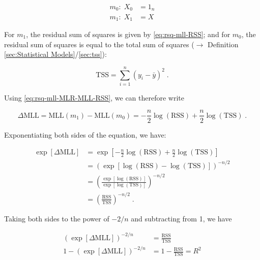 \documentclass[a4paper,12pt,twoside]{book}
\begin{document}
\begin{equation} \label{eq:rsq-mll-m0-m1}
\begin{split}
m_0: \; X_0 &= 1_n \\
m_1: \; X_1 &= X
\end{split}
\end{equation}

For $m_1$, the residual sum of squares is given by \eqref{eq:rsq-mll-RSS}; and for $m_0$, the residual sum of squares is equal to the total sum of squares ($\rightarrow$ Definition \ref{sec:Statistical Models}/\ref{sec:tss}):

\begin{equation} \label{eq:rsq-mll-TSS}
\mathrm{TSS} = \sum_{i=1}^n (y_i - \bar{y})^2 \; .
\end{equation}

Using \eqref{eq:rsq-mll-MLR-MLL-RSS}, we can therefore write

\begin{equation} \label{eq:rsq-mll-MLR-DMLL}
\Delta\mathrm{MLL} = \mathrm{MLL}(m_1) - \mathrm{MLL}(m_0) = - \frac{n}{2} \log(\mathrm{RSS}) + \frac{n}{2} \log(\mathrm{TSS}) \; .
\end{equation}

Exponentiating both sides of the equation, we have:

\begin{equation} \label{eq:rsq-mll-MLR-DMLL-RTSS}
\begin{split}
\exp[\Delta\mathrm{MLL}] &= \exp\left[ - \frac{n}{2} \log(\mathrm{RSS}) + \frac{n}{2} \log(\mathrm{TSS}) \right] \\
&= \left( \exp\left[ \log(\mathrm{RSS}) - \log(\mathrm{TSS}) \right] \right)^{-n/2} \\
&= \left( \frac{\exp[\log(\mathrm{RSS})]}{\exp[\log(\mathrm{TSS})]} \right)^{-n/2} \\
&= \left( \frac{\mathrm{RSS}}{\mathrm{TSS}} \right)^{-n/2} \; .
\end{split}
\end{equation}

Taking both sides to the power of $-2/n$ and subtracting from 1, we have

\begin{equation} \label{eq:rsq-mll-MLR-DMLL-R2}
\begin{split}
\left( \exp[\Delta\mathrm{MLL}] \right)^{-2/n} &= \frac{\mathrm{RSS}}{\mathrm{TSS}} \\
1 - \left( \exp[\Delta\mathrm{MLL}] \right)^{-2/n} &= 1 - \frac{\mathrm{RSS}}{\mathrm{TSS}} = R^2
\end{split}
\end{equation}
\end{document}
